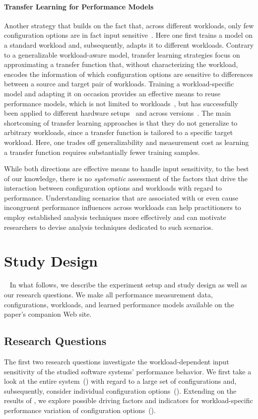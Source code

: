 {\paragraph{Transfer Learning for Performance Models}\label{sec:transfer}
Another strategy that builds on the fact that, across different workloads, only few configuration options are in fact input sensitive~\cite{jamishidi_transfer_2017}. Here one first trains a model on a standard workload and, subsequently, adapts it to different workloads. Contrary to a generalizable workload-aware model, transfer learning strategies focus on approximating a transfer function that, without characterizing the workload, encodes the information of which configuration options are sensitive to differences between a source and target pair of workloads. Training a workload-specific model and adapting it on occasion provides an effective means to reuse performance models, which is not limited to workloads~\cite{jamshidi_learning_2018}, but has successfully been applied to different hardware setups~\cite{ding_bayesian_2020,valov_transferring_performance_2017} and across versions~\cite{martin_transfer_2021}. The main shortcoming of transfer learning approaches is that they do not generalize to arbitrary workloads, since a transfer function is tailored to a specific target workload. Here, one trades off generalizability and measurement cost as learning a transfer function requires substantially fewer training samples.

While both directions are effective means to handle input sensitivity, to the best of our knowledge, there is no \textit{systematic} assessment of the factors that drive the interaction between configuration options and workloads with regard to performance. Understanding scenarios that are associated with or even cause incongruent performance influences across workloads can help practitioners to employ established analysis techniques more effectively and can motivate researchers to devise analysis techniques dedicated to such scenarios.

\section{Study Design}~\label{sec:study}
In what follows, we describe the experiment setup and study design as well as our research questions. We make all performance measurement data, configurations, workloads, and learned performance models available on the paper's companion Web site.

\subsection{Research Questions}
The first two research questions investigate the workload-dependent input sensitivity of the studied software systems' performance behavior. We first take a look at the entire system~() with regard to a large set of configurations and, subsequently, consider individual configuration options~(). Extending on the results of , we explore possible driving factors and indicators for workload-specific performance variation of configuration options~().

}
